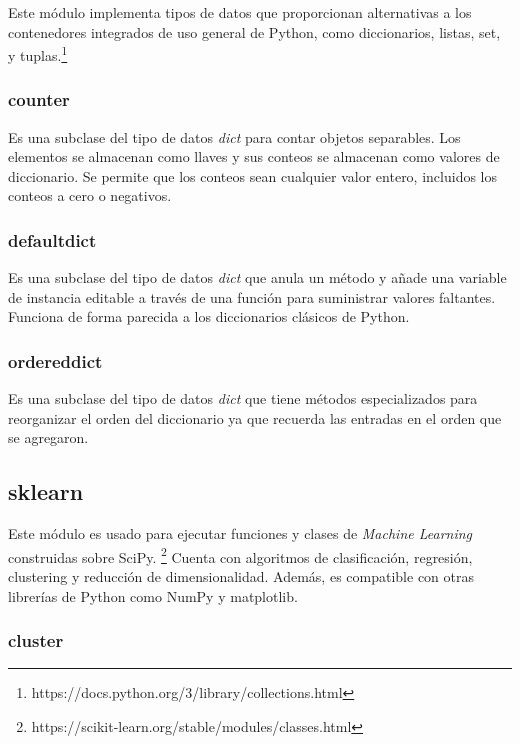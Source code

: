 \documentclass[a4paper, 12pt]{book}
\begin{document}
Este módulo implementa tipos de datos que proporcionan alternativas a los contenedores integrados de uso general de Python, como diccionarios, listas, set, y tuplas.\footnote{https://docs.python.org/3/library/collections.html}

\subsubsection{counter}
\label{sec:difflib_counter}

Es una subclase del tipo de datos \textit{dict} para contar objetos separables. Los elementos se almacenan como llaves y sus conteos se almacenan como valores de diccionario. Se permite que los conteos sean cualquier valor entero, incluidos los conteos a cero o negativos.

\subsubsection{defaultdict}
\label{sec:difflib_defaultdict}

Es una subclase del tipo de datos \textit{dict} que anula un método y añade una variable de instancia editable a través de una función para suministrar valores faltantes. Funciona de forma parecida a los diccionarios clásicos de Python.

\subsubsection{ordereddict}
\label{sec:difflib_ordereddict}

Es una subclase del tipo de datos \textit{dict} que tiene métodos especializados para reorganizar el orden del diccionario ya que recuerda las entradas en el orden que se agregaron.

\subsection{sklearn}
\label{sec:sklearn}

Este módulo es usado para ejecutar funciones y clases de \textit{Machine Learning} construidas sobre SciPy. \footnote{https://scikit-learn.org/stable/modules/classes.html} Cuenta con algoritmos de clasificación, regresión, clustering y reducción de dimensionalidad. Además, es compatible con otras librerías de Python como NumPy y matplotlib.

\subsubsection{cluster}
\label{sec:sklearn_cluster}
\end{document}
